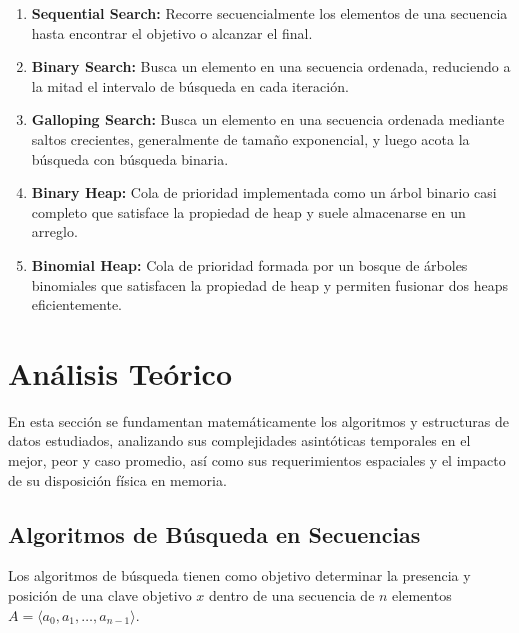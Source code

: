 \documentclass[11pt,letterpaper]{article}
\begin{document}
\begin{enumerate}
    \item \textbf{Sequential Search:} Recorre secuencialmente los elementos de una secuencia hasta encontrar el objetivo o alcanzar el final.
    \item \textbf{Binary Search:} Busca un elemento en una secuencia ordenada, reduciendo a la mitad el intervalo de búsqueda en cada iteración.
    \item \textbf{Galloping Search:} Busca un elemento en una secuencia ordenada mediante saltos crecientes, generalmente de tamaño exponencial, y luego acota la búsqueda con búsqueda binaria.
    \item \textbf{Binary Heap:} Cola de prioridad implementada como un árbol binario casi completo que satisface la propiedad de heap y suele almacenarse en un arreglo.
    \item \textbf{Binomial Heap:} Cola de prioridad formada por un bosque de árboles binomiales que satisfacen la propiedad de heap y permiten fusionar dos heaps eficientemente.
\end{enumerate}

\newpage

\section{Análisis Teórico}
En esta sección se fundamentan matemáticamente los algoritmos y estructuras de datos estudiados, analizando sus complejidades asintóticas temporales en el mejor, peor y caso promedio, así como sus requerimientos espaciales y el impacto de su disposición física en memoria.


\subsection{Algoritmos de Búsqueda en Secuencias}
Los algoritmos de búsqueda tienen como objetivo determinar la presencia y posición de una clave objetivo $x$ dentro de una secuencia de $n$ elementos $A = \langle a_0, a_1, \dots, a_{n-1} \rangle$.
\end{document}
